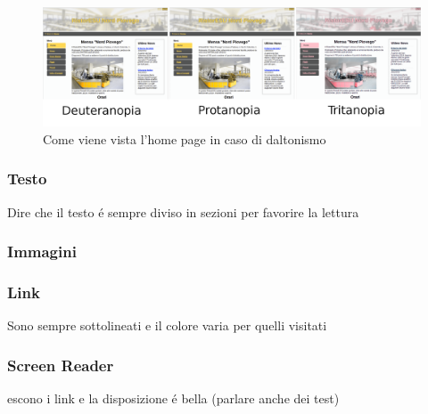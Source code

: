 \documentclass[10pt,a4paper,onecolumn]{article}
\begin{document}
\begin{figure}[h]
\centering
\includegraphics[scale=0.18]{home_colors}
\caption{Come viene vista l'home page in caso di daltonismo}
\label{colors}
\end{figure}

\subsubsection{Testo}

Dire che il testo \'e sempre diviso in sezioni per favorire la lettura

\subsubsection{Immagini}

\subsubsection{Link}

Sono sempre sottolineati e il colore varia per quelli visitati

\subsubsection{Screen Reader}

escono i link e la disposizione \'e bella (parlare anche dei test)

\clearpage
\end{document}
